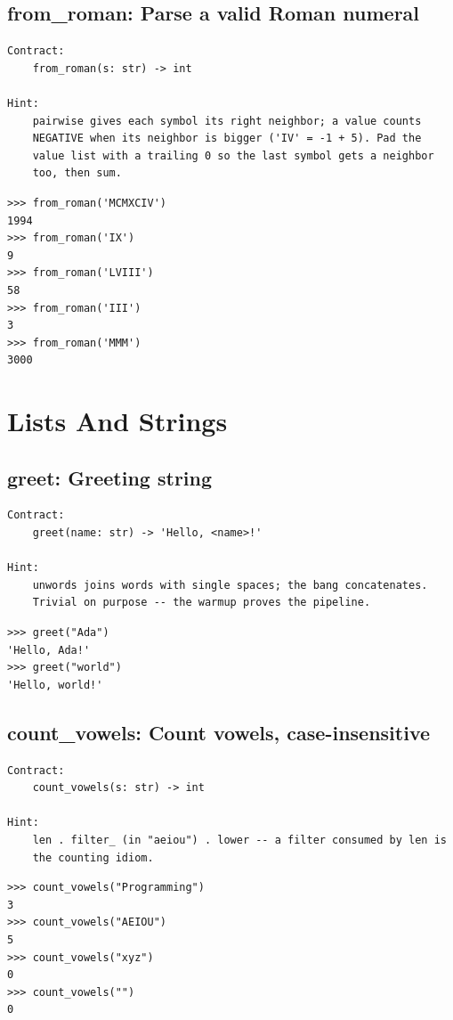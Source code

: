 \documentclass[10pt,letterpaper]{book}
\begin{document}
\section{from\_roman: Parse a valid Roman numeral}
\begin{lstlisting}[style=ex]
Contract:
    from_roman(s: str) -> int

Hint:
    pairwise gives each symbol its right neighbor; a value counts
    NEGATIVE when its neighbor is bigger ('IV' = -1 + 5). Pad the
    value list with a trailing 0 so the last symbol gets a neighbor
    too, then sum.
\end{lstlisting}
\begin{lstlisting}[style=ex]
>>> from_roman('MCMXCIV')
1994
>>> from_roman('IX')
9
>>> from_roman('LVIII')
58
>>> from_roman('III')
3
>>> from_roman('MMM')
3000
\end{lstlisting}
\chapter{Lists And Strings}

\section{greet: Greeting string}
\begin{lstlisting}[style=ex]
Contract:
    greet(name: str) -> 'Hello, <name>!'

Hint:
    unwords joins words with single spaces; the bang concatenates.
    Trivial on purpose -- the warmup proves the pipeline.
\end{lstlisting}
\begin{lstlisting}[style=ex]
>>> greet("Ada")
'Hello, Ada!'
>>> greet("world")
'Hello, world!'
\end{lstlisting}

\section{count\_vowels: Count vowels, case-insensitive}
\begin{lstlisting}[style=ex]
Contract:
    count_vowels(s: str) -> int

Hint:
    len . filter_ (in "aeiou") . lower -- a filter consumed by len is
    the counting idiom.
\end{lstlisting}
\begin{lstlisting}[style=ex]
>>> count_vowels("Programming")
3
>>> count_vowels("AEIOU")
5
>>> count_vowels("xyz")
0
>>> count_vowels("")
0
\end{lstlisting}
\end{document}
